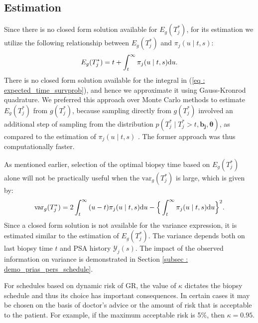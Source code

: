 
\subsection{Estimation}
Since there is no closed form solution available for $E_g(T^*_j)$, for its estimation we utilize the following relationship between $E_g(T^*_j)$ and $\pi_j(u \mid t, s)$:
\begin{equation}
\label{eq : expected_time_survprob}
E_g(T^*_j) = t + \int_t^\infty \pi_j(u \mid t, s) \rmn{d} u.
\end{equation}
There is no closed form solution available for the integral in (\ref{eq : expected_time_survprob}), and hence we approximate it using Gauss-Kronrod quadrature. We preferred this approach over Monte Carlo methods to estimate $E_g(T^*_j)$ from $g(T^*_j)$, because sampling directly from $g(T^*_j)$ involved an additional step of sampling from the distribution $p(T^*_j \mid T^*_j > t, \boldsymbol{b_j}, \boldsymbol{\theta})$, as compared to the estimation of $\pi_j(u \mid t, s)$ \citep{rizopoulos2011dynamic}. The former approach was thus computationally faster. 

As mentioned earlier, selection of the optimal biopsy time based on $E_g(T_j^*)$ alone will not be practically useful when the $\mbox{var}_g(T^*_j)$ is large, which is given by:
\begin{equation}
\label{eq : var_time_survprob}
\mbox{var}_g(T^*_j) = 2 \int_t^\infty {(u-t) \pi_j(u \mid t, s) \rmn{d} u} - \Big\{\int_t^\infty \pi_j(u \mid t, s) \rmn{d} u\Big\}^2.
\end{equation}
Since a closed form solution is not available for the variance expression, it is estimated similar to the estimation of $E_g(T^*_j)$. The variance depends both on last biopsy time $t$ and PSA history $\mathcal{Y}_j(s)$. The impact of the observed information on variance is demonstrated in Section \ref{subsec : demo_prias_pers_schedule}.

For schedules based on dynamic risk of GR, the value of $\kappa$ dictates the biopsy schedule and thus its choice has important consequences. In certain cases it may be chosen on the basis of doctor's advice or the amount of risk that is acceptable to the patient. For example, if the maximum acceptable risk is 5\%, then $\kappa = 0.95$.

